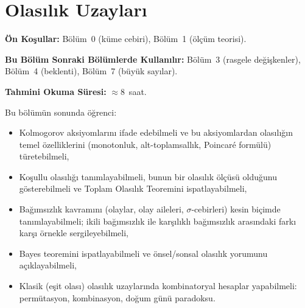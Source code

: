
\chapter{Olasılık Uzayları}


\noindent\textbf{Ön Koşullar:} Bölüm~0 (küme cebiri), Bölüm~1 (ölçüm teorisi).

\noindent\textbf{Bu Bölüm Sonraki Bölümlerde Kullanılır:}
Bölüm~3 (rasgele değişkenler),
Bölüm~4 (beklenti),
Bölüm~7 (büyük sayılar).

\noindent\textbf{Tahmini Okuma Süresi:} $\approx 8$~saat.

\vspace{0.5\baselineskip}

\begin{kazanimlar}
Bu bölümün sonunda öğrenci:
\begin{itemize}
  \item Kolmogorov aksiyomlarını ifade edebilmeli ve bu aksiyomlardan
        olasılığın temel özelliklerini (monotonluk, alt-toplamsallık,
        Poincaré formülü) türetebilmeli,
  \item Koşullu olasılığı tanımlayabilmeli, bunun bir olasılık ölçüsü
        olduğunu gösterebilmeli ve Toplam Olasılık Teoremini ispatlayabilmeli,
  \item Bağımsızlık kavramını (olaylar, olay aileleri, $\sigma$-cebirleri)
        kesin biçimde tanımlayabilmeli; ikili bağımsızlık ile karşılıklı
        bağımsızlık arasındaki farkı karşı örnekle sergileyebilmeli,
  \item Bayes teoremini ispatlayabilmeli ve önsel/sonsal olasılık yorumunu
        açıklayabilmeli,
  \item Klasik (eşit olası) olasılık uzaylarında kombinatoryal hesaplar
        yapabilmeli: permütasyon, kombinasyon, doğum günü paradoksu.
\end{itemize}
\end{kazanimlar}

